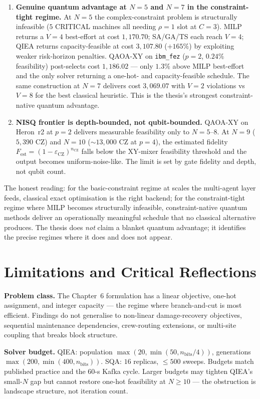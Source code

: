 \begin{enumerate}
    \item \textbf{Genuine quantum advantage at $N=5$ and $N=7$ in the constraint-tight regime.} At $N=5$ the complex-constraint problem is structurally infeasible ($5$ CRITICAL machines all needing $\rho=1$ slot at $C=3$). MILP returns a $V=4$ best-effort at cost $1{,}170.70$; SA/GA/TS each reach $V=4$; QIEA returns capacity-feasible at cost $3{,}107.80$ ($+165\%$) by exploiting weaker risk-horizon penalties. QAOA-XY on \texttt{ibm\_fez} ($p=2$, $0.24\%$ feasibility) post-selects cost $1{,}186.02$ --- only $1.3\%$ above MILP best-effort and the only solver returning a one-hot- and capacity-feasible schedule. The same construction at $N=7$ delivers cost $3{,}069.07$ with $V=2$ violations vs $V=8$ for the best classical heuristic. This is the thesis's strongest constraint-native quantum advantage.
    \item \textbf{NISQ frontier is depth-bounded, not qubit-bounded.} QAOA-XY on Heron~r2 at $p=2$ delivers measurable feasibility only to $N=5$--$8$. At $N=9$ ($5{,}390$ CZ) and $N=10$ ($\sim 13{,}000$ CZ at $p=4$), the estimated fidelity $F_{\text{est}}=(1-\varepsilon_{\text{CZ}})^{n_{\text{CZ}}}$ falls below the XY-mixer feasibility threshold and the output becomes uniform-noise-like. The limit is set by gate fidelity and depth, not qubit count.
\end{enumerate}

The honest reading: for the basic-constraint regime at scales the multi-agent layer feeds, classical exact optimisation is the right backend; for the constraint-tight regime where MILP becomes structurally infeasible, constraint-native quantum methods deliver an operationally meaningful schedule that no classical alternative produces. The thesis does \emph{not} claim a blanket quantum advantage; it identifies the precise regimes where it does and does not appear.

\section{Limitations and Critical Reflections}

\textbf{Problem class.} The Chapter~6 formulation has a linear objective, one-hot assignment, and integer capacity --- the regime where branch-and-cut is most efficient. Findings do not generalise to non-linear damage-recovery objectives, sequential maintenance dependencies, crew-routing extensions, or multi-site coupling that breaks block structure.

\textbf{Solver budget.} QIEA: population $\max(20,\min(50, n_{\text{bits}}/4))$, generations $\max(200,\min(400, n_{\text{bits}}))$. SQA: $16$ replicas, $\leq 500$ sweeps. Budgets match published practice and the $60$-s Kafka cycle. Larger budgets may tighten QIEA's small-$N$ gap but cannot restore one-hot feasibility at $N\geq 10$ — the obstruction is landscape structure, not iteration count.

